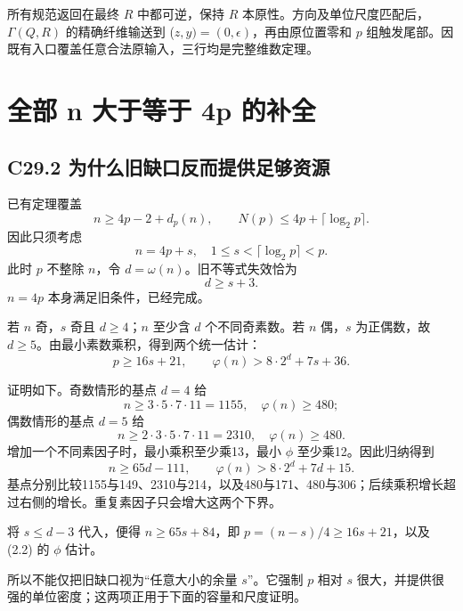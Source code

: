 \documentclass[11pt,a4paper]{article}
\theoremstyle{definition}
\numberwithin{equation}{section}
\begin{document}
{所有规范返回在最终} {\ensuremath{R}} {中都可逆，保持} {\ensuremath{R}} {本原性。方向及单位尺度匹配后，\ensuremath{\Gamma (Q,R)}} {的精确纤维输送到} {(\ensuremath{z,y)=(0,\epsilon )}，再由原位置零和} {\ensuremath{p}} {组触发尾部。因既有入口覆盖任意合法原输入，三行均是完整维数定理。}


\section{全部 n 大于等于 4p 的补全}\label{construct:wide-tail}
\subsection*{\texorpdfstring{{C29.2} {为什么旧缺口反而提供足够资源}}{C29.2 为什么旧缺口反而提供足够资源}}\label{C29-h182}

{已有定理覆盖} \[
n\ge4p-2+d_p(n),\qquad N(p)\le4p+\lceil\log_2p\rceil.
\] {因此只须考虑} \[
n=4p+s,\quad1\le s<\lceil\log_2p\rceil<p.
\] {此时} {\ensuremath{p}} {不整除} {\ensuremath{n}，令} {\ensuremath{d=\omega (n)}。旧不等式失效恰为} \[
\boxed{d\ge s+3.}
\tag{C29.2.1}
\] {\ensuremath{n=4p}} {本身满足旧条件，已经完成。}

{若} {\ensuremath{n}} {奇，\ensuremath{s}} {奇且} {\ensuremath{d\ge 4}；\ensuremath{n}} {至少含} {\ensuremath{d}} {个不同奇素数。若} {\ensuremath{n}} {偶，\ensuremath{s}} {为正偶数，故} {\ensuremath{d\ge 5}。由最小素数乘积，得到两个统一估计：} \[
\boxed{p\ge16s+21,\qquad
\varphi(n)>8\cdot2^d+7s+36.}
\tag{C29.2.2}
\]

{证明如下。奇数情形的基点} {\ensuremath{d=4}} {给} \[
n\ge3\cdot5\cdot7\cdot11=1155,\quad\varphi(n)\ge480;
\] {偶数情形的基点} {\ensuremath{d=5}} {给} \[
n\ge2\cdot3\cdot5\cdot7\cdot11=2310,\quad\varphi(n)\ge480.
\] {增加一个不同素因子时，最小乘积至少乘13，最小} {\ensuremath{\phi }} {至少乘12。因此归纳得到} \[
n\ge65d-111,\qquad\varphi(n)>8\cdot2^d+7d+15.
\] {基点分别比较1155与149、2310与214，以及480与171、480与306；后续乘积增长超过右侧的增长。重复素因子只会增大这两个下界。}

{将} {\ensuremath{s\le d-3}} {代入，便得} {\ensuremath{n\ge 65s+84}，即} {\ensuremath{p=(n-s)/4\ge 16s+21}，以及} {(2.2)} {的} {\ensuremath{\phi }} {估计。}

{所以不能仅把旧缺口视为``任意大小的余量} {\ensuremath{s}''。它强制} {\ensuremath{p}} {相对} {\ensuremath{s}} {很大，并提供很强的单位密度；这两项正用于下面的容量和尺度证明。}
\end{document}
